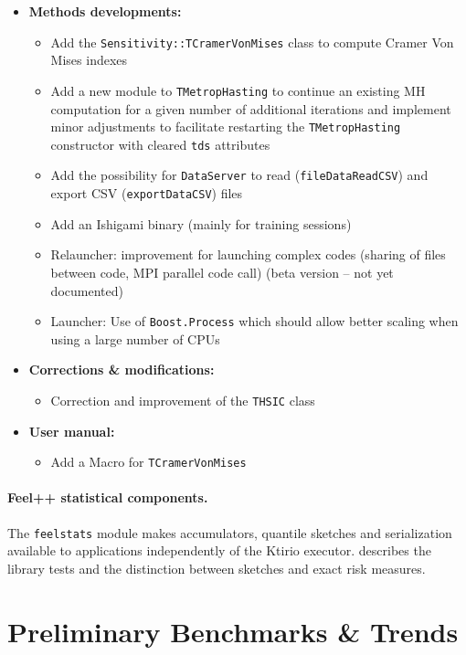 \begin{itemize}
	\item \textbf{Methods developments:}
	\begin{itemize}
		\item Add the \texttt{Sensitivity::TCramerVonMises} class to compute Cramer Von Mises indexes
    	\item Add a new module to \texttt{TMetropHasting} to continue an existing MH computation for a given number of additional iterations and implement minor adjustments to facilitate restarting the \texttt{TMetropHasting} constructor with cleared \texttt{tds} attributes
    	\item Add the possibility for \texttt{DataServer} to read (\texttt{fileDataReadCSV}) and export CSV (\texttt{exportDataCSV}) files
    	\item Add an Ishigami binary (mainly for training sessions)
    	\item Relauncher: improvement for launching complex codes (sharing of files between code, MPI parallel code call) (beta version -- not yet documented)
    	\item Launcher: Use of \texttt{Boost.Process} which should allow better scaling when using a large number of CPUs
	\end{itemize}
	\item \textbf{Corrections \& modifications:}
	\begin{itemize}
		\item Correction and improvement of the \texttt{THSIC} class
	\end{itemize}
	\item \textbf{User manual:}
	\begin{itemize}
		\item Add a Macro for \texttt{TCramerVonMises}
	\end{itemize}
\end{itemize}


\paragraph{Feel++ statistical components.}
The \texttt{feelstats} module makes accumulators, quantile sketches and
serialization available to applications independently of the Ktirio
executor.  describes the
library tests and the distinction between sketches and exact risk measures.

\section{Preliminary Benchmarks \& Trends}
\label{sec:wp6:benchmarks}


